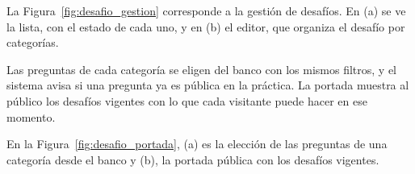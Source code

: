 La Figura~\ref{fig:desafio_gestion} corresponde a la gestión de desafíos. En (a) se ve la lista, con el estado de cada uno, y en (b) el editor, que organiza el desafío por categorías.


Las preguntas de cada categoría se eligen del banco con los mismos filtros, y el sistema avisa si una pregunta ya es pública en la práctica. La portada muestra al público los desafíos vigentes con lo que cada visitante puede hacer en ese momento.

En la Figura~\ref{fig:desafio_portada}, (a) es la elección de las preguntas de una categoría desde el banco y (b), la portada pública con los desafíos vigentes.

